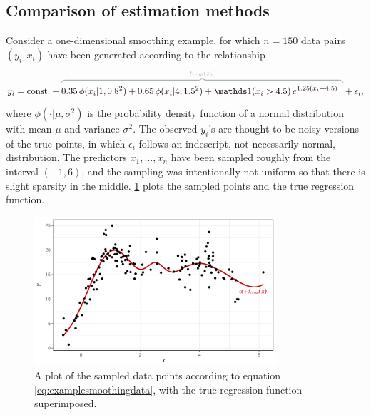 \subsection{Comparison of estimation methods}
\label{sec:compareestimation}

Consider a one-dimensional smoothing example, for which $n=150$ data pairs $(y_i,x_i)$ have been generated according to the relationship 
\begin{align}\label{eq:examplesmoothingdata}
  \begin{gathered}
    y_i = \const + \myoverbrace{
    0.35 \, \phi(x_i|1,0.8^2) + 0.65 \, \phi(x_i|4,1.5^2)
    + \ind(x_i > 4.5)\, e^{1.25(x_i-4.5)}\phantom{\Big)}
    }{f_\text{true}(x_i)} + \epsilon_i,
  \end{gathered}
\end{align}
where $\phi(\cdot|\mu,\sigma^2)$ is the probability density function of a normal distribution with mean $\mu$ and variance $\sigma^2$.
The observed $y_i$'s are thought to be noisy versions of the true points, in which $\epsilon_i$ follows an indescript, not necessarily normal, distribution.
The predictors $x_1,\dots,x_n$ have been sampled roughly from the interval $(-1,6)$, and the sampling was intentionally not uniform so that there is slight sparsity in the middle.
\cref{fig:examplesmoothingdata} plots the sampled points and the true regression function.

\begin{figure}[hbt]
  \centering
  \includegraphics[width=0.8\textwidth]{figure/04-example_data}
  \caption{A plot of the sampled data points according to equation \cref{eq:examplesmoothingdata}, with the true regression function superimposed.}
  \label{fig:examplesmoothingdata}
\end{figure}

